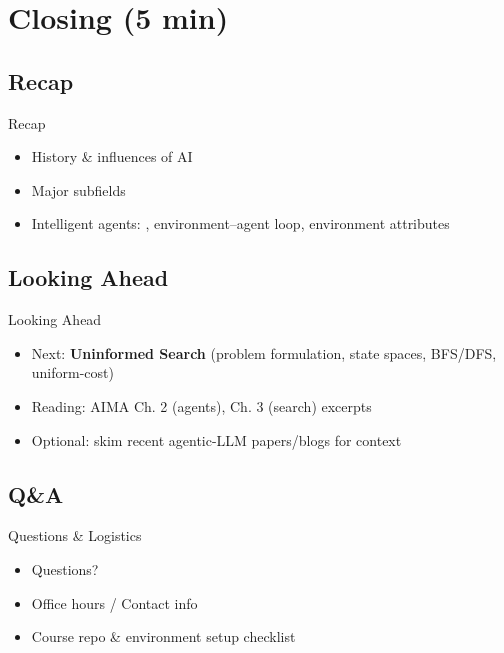 \documentclass[aspectratio=169]{beamer}
\begin{document}
\section{Closing (5 min)}

\subsection{Recap}
\begin{frame}{Recap}
\begin{itemize}
  \item History \& influences of AI
  \item Major subfields
  \item Intelligent agents: \PEAS{}, environment–agent loop, environment attributes
\end{itemize}
\end{frame}

\subsection{Looking Ahead}
\begin{frame}{Looking Ahead}
\begin{itemize}
  \item Next: \textbf{Uninformed Search} (problem formulation, state spaces, BFS/DFS, uniform-cost)
  \item Reading: AIMA Ch. 2 (agents), Ch. 3 (search) excerpts
  \item Optional: skim recent agentic-LLM papers/blogs for context
\end{itemize}
\end{frame}

\subsection{Q\&A}
\begin{frame}{Questions \& Logistics}
\begin{itemize}
  \item Questions?
  \item Office hours / Contact info
  \item Course repo \& environment setup checklist
\end{itemize}
\end{frame}
\end{document}
